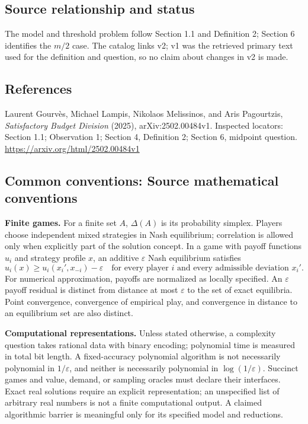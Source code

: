 \documentclass[11pt,a4paper]{article}
\begin{document}
\subsection*{Source relationship and status}
The model and threshold problem follow Section 1.1 and Definition 2; Section 6 identifies the $m/2$ case. The catalog links v2; v1 was the retrieved primary text used for the definition and question, so no claim about changes in v2 is made.

\subsection*{References}
\begingroup\footnotesize\raggedright
\noindent [S1] Laurent Gourv\`es, Michael Lampis, Nikolaos Melissinos, and Aris Pagourtzis, \emph{Satisfactory Budget Division} (2025), arXiv:2502.00484v1. Inspected locators: Section 1.1; Observation 1; Section 4, Definition 2; Section 6, midpoint question.
\url{https://arxiv.org/html/2502.00484v1}
\par\endgroup

\subsection*{Common conventions: Source mathematical conventions}

\textbf{Finite games.} For a finite set $A$, $\Delta(A)$ is its probability
simplex. Players choose independent mixed strategies in Nash equilibrium;
correlation is allowed only when explicitly part of the solution concept.
In a game with payoff functions $u_i$ and strategy profile $x$, an additive
$\varepsilon$ Nash equilibrium satisfies
\[
 u_i(x)\geq u_i(x_i',x_{-i})-\varepsilon
 \quad\text{for every player $i$ and every admissible deviation $x_i'$}.
\]
For numerical approximation, payoffs are normalized as locally specified.
An $\varepsilon$ payoff residual is distinct from distance at most
$\varepsilon$ to the set of exact equilibria. Point convergence, convergence
of empirical play, and convergence in distance to an equilibrium set are
also distinct.

\textbf{Computational representations.} Unless stated otherwise, a complexity
question takes rational data with binary encoding; polynomial time is measured
in total bit length. A fixed-accuracy polynomial algorithm is not necessarily
polynomial in $1/\varepsilon$, and neither is necessarily polynomial in
$\log(1/\varepsilon)$. Succinct games and value, demand, or sampling oracles
must declare their interfaces. Exact real solutions require an explicit
representation; an unspecified list of arbitrary real numbers is not a
finite computational output. A claimed algorithmic barrier is meaningful
only for its specified model and reductions.
\end{document}

